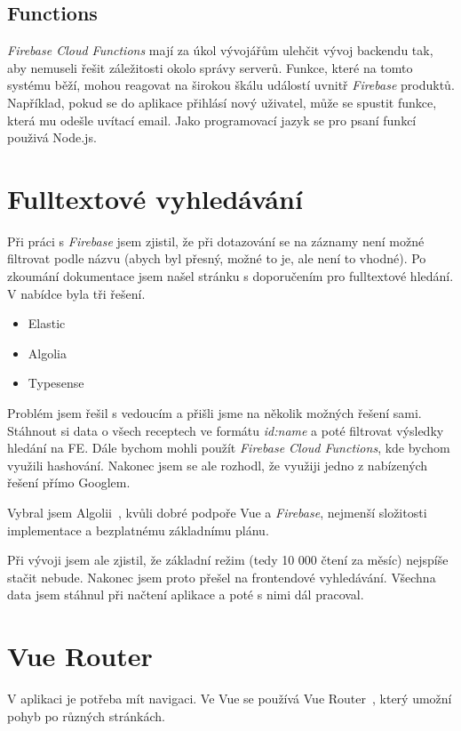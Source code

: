 \subsection{Functions}
\emph{Firebase Cloud Functions} mají za úkol vývojářům ulehčit vývoj backendu tak, aby nemuseli řešit záležitosti okolo správy serverů.
Funkce, které na tomto systému běží, mohou reagovat na širokou škálu událostí uvnitř \emph{Firebase} produktů. Například, pokud se do aplikace
přihlásí nový uživatel, může se spustit funkce, která mu odešle uvítací email. Jako programovací jazyk se pro psaní funkcí použivá Node.js.~\cite{FirebaseFunctions}

\section{Fulltextové vyhledávání}
Při práci s \emph{Firebase} jsem zjistil, že při dotazování se na záznamy není možné filtrovat podle názvu
(abych byl přesný, možné to je, ale není to vhodné). Po zkoumání dokumentace jsem našel stránku s doporučením pro
fulltextové hledání. V nabídce byla tři řešení.~\cite{FulltextSearch}

\begin{itemize}
    \item Elastic
    \item Algolia
    \item Typesense
\end{itemize}

Problém jsem řešil s vedoucím a přišli jsme na několik možných řešení sami. Stáhnout si data o všech receptech ve formátu
\emph{id:name} a poté filtrovat výsledky hledání na FE. Dále bychom mohli použít \emph{Firebase Cloud Functions}, kde bychom
využili hashování. Nakonec jsem se ale rozhodl, že využiji jedno z nabízených řešení přímo Googlem.

Vybral jsem Algolii~\cite{Algolia}, kvůli dobré podpoře Vue a \emph{Firebase}, nejmenší složitosti implementace a bezplatnému základnímu plánu.

Při vývoji jsem ale zjistil, že základní režim (tedy 10 000 čtení za měsíc) nejspíše stačit nebude. Nakonec jsem proto přešel na
frontendové vyhledávání. Všechna data jsem stáhnul při načtení aplikace a poté s nimi dál pracoval.

\section{Vue Router}
V aplikaci je potřeba mít navigaci. Ve Vue se používá Vue Router~\cite{VueRouter}, který umožní pohyb po různých stránkách.

